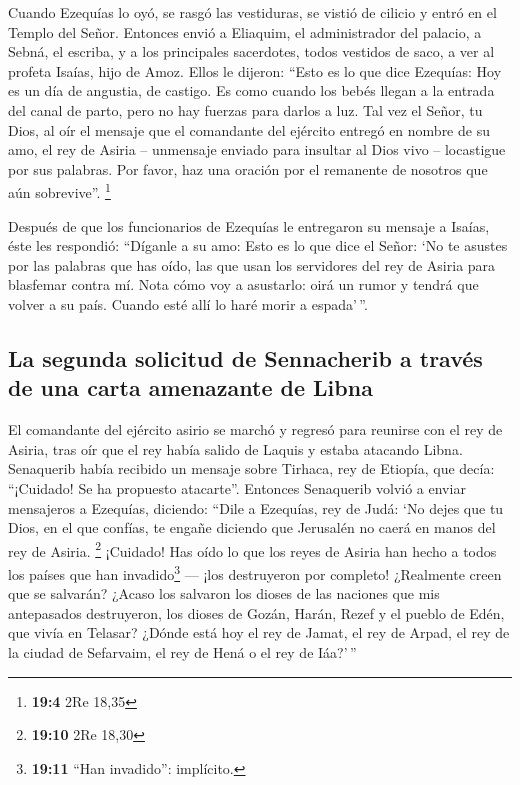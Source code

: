  Cuando Ezequías lo oyó, se rasgó las vestiduras, se
vistió de cilicio y entró en el Templo del Señor. 
Entonces envió a Eliaquim, el administrador del palacio, a Sebná, el
escriba, y a los principales sacerdotes, todos vestidos de saco, a ver
al profeta Isaías, hijo de Amoz.  Ellos le dijeron: ``Esto
es lo que dice Ezequías: Hoy es un día de angustia, de castigo. Es como
cuando los bebés llegan a la entrada del canal de parto, pero no hay
fuerzas para darlos a luz.  Tal vez el Señor, tu Dios, al
oír el mensaje que el comandante del ejército entregó en nombre de su
amo, el rey de Asiria -- unmensaje enviado para insultar al Dios vivo --
locastigue por sus palabras. Por favor, haz una oración por el remanente
de nosotros que aún sobrevive''. \footnote{\textbf{19:4} 2Re 18,35}

 Después de que los funcionarios de Ezequías le entregaron
su mensaje a Isaías,  éste les respondió: ``Díganle a su
amo: Esto es lo que dice el Señor: `No te asustes por las palabras que
has oído, las que usan los servidores del rey de Asiria para blasfemar
contra mí.  Nota cómo voy a asustarlo: oirá un rumor y
tendrá que volver a su país. Cuando esté allí lo haré morir a
espada'\,''.

\hypertarget{la-segunda-solicitud-de-sennacherib-a-travuxe9s-de-una-carta-amenazante-de-libna}{%
\subsection{La segunda solicitud de Sennacherib a través de una carta
amenazante de
Libna}\label{la-segunda-solicitud-de-sennacherib-a-travuxe9s-de-una-carta-amenazante-de-libna}}

 El comandante del ejército asirio se marchó y regresó
para reunirse con el rey de Asiria, tras oír que el rey había salido de
Laquis y estaba atacando Libna.  Senaquerib había recibido
un mensaje sobre Tirhaca, rey de Etiopía, que decía: ``¡Cuidado! Se ha
propuesto atacarte''. Entonces Senaquerib volvió a enviar mensajeros a
Ezequías, diciendo:  ``Dile a Ezequías, rey de Judá: `No
dejes que tu Dios, en el que confías, te engañe diciendo que Jerusalén
no caerá en manos del rey de Asiria. \footnote{\textbf{19:10} 2Re 18,30}
 ¡Cuidado! Has oído lo que los reyes de Asiria han hecho
a todos los países que han invadido\footnote{\textbf{19:11} ``Han
  invadido'': implícito.} --- ¡los destruyeron por completo! ¿Realmente
creen que se salvarán?  ¿Acaso los salvaron los dioses de
las naciones que mis antepasados destruyeron, los dioses de Gozán,
Harán, Rezef y el pueblo de Edén, que vivía en Telasar? 
¿Dónde está hoy el rey de Jamat, el rey de Arpad, el rey de la ciudad de
Sefarvaim, el rey de Hená o el rey de Iáa?'\,''

